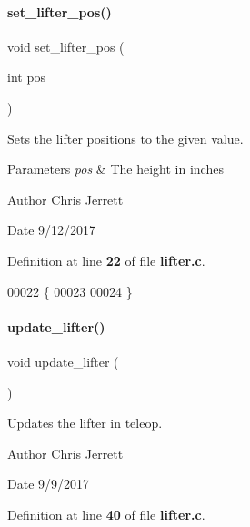 \paragraph{set\+\_\+lifter\+\_\+pos()}
{\footnotesize\ttfamily void set\+\_\+lifter\+\_\+pos (\begin{DoxyParamCaption}\item[{int}]{pos }\end{DoxyParamCaption})}



Sets the lifter positions to the given value. 


\begin{DoxyParams}{Parameters}
{\em pos} & The height in inches \\
\hline
\end{DoxyParams}
\begin{DoxyAuthor}{Author}
Chris Jerrett 
\end{DoxyAuthor}
\begin{DoxyDate}{Date}
9/12/2017 
\end{DoxyDate}


Definition at line \textbf{ 22} of file \textbf{ lifter.\+c}.


\begin{DoxyCode}
00022                              \{
00023 
00024 \}
\end{DoxyCode}
\mbox{\label{lifter_8h_a59bb7413777ca16aba124aaedf95c79b}} 
\paragraph{update\+\_\+lifter()}
{\footnotesize\ttfamily void update\+\_\+lifter (\begin{DoxyParamCaption}{ }\end{DoxyParamCaption})}



Updates the lifter in teleop. 

\begin{DoxyAuthor}{Author}
Chris Jerrett 
\end{DoxyAuthor}
\begin{DoxyDate}{Date}
9/9/2017 
\end{DoxyDate}


Definition at line \textbf{ 40} of file \textbf{ lifter.\+c}.



